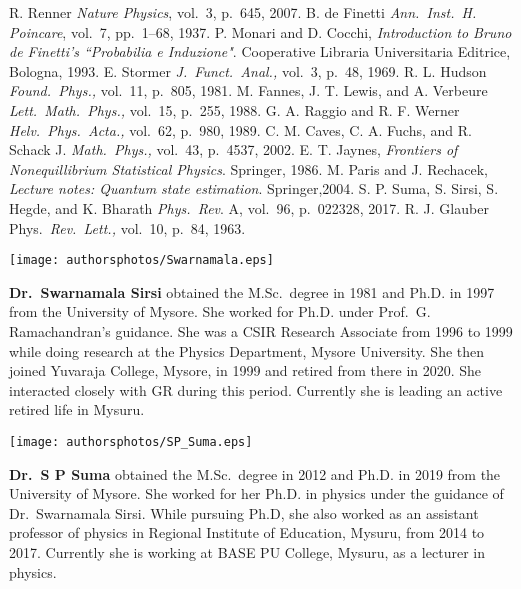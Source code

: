 \begin{thebibliography}{99}
 R. Renner \textit{Nature Physics}, vol.\ 3, p.\ 645, 2007.
 B. de Finetti \textit{Ann.\ Inst.\ H. Poincare}, vol.\ 7, pp.\ 1--68, 1937.
 P. Monari and D. Cocchi, \textit{Introduction to Bruno de Finetti's ``Probabilia e Induzione"}. Cooperative Libraria Universitaria Editrice, Bologna, 1993.
 E. Stormer \textit{J.\ Funct.\ Anal.,} vol.\ 3, p.\ 48, 1969.
 R. L. Hudson \textit{Found.\ Phys.,} vol.\ 11, p.\ 805, 1981.
 M. Fannes, J. T. Lewis, and A. Verbeure \textit{Lett.\ Math.\ Phys.,} vol.\ 15, p.\ 255, 1988.
 G. A. Raggio and R. F. Werner \textit{Helv.\ Phys.\ Acta.,} vol.\ 62, p.\ 980, 1989.
 C. M. Caves, C. A. Fuchs, and R. Schack J. \textit{Math.\ Phys.,} vol.\ 43, p.\ 4537, 2002.
 E. T. Jaynes, \textit{Frontiers of Nonequillibrium Statistical Physics}. Springer, 1986.
 M. Paris and J. Rechacek, \textit{Lecture notes: Quantum state estimation}. Springer,2004.
 S. P. Suma, S. Sirsi, S. Hegde, and K. Bharath \textit{Phys.\ Rev}. A, vol.\ 96, p.\ 022328, 2017.
 R. J. Glauber Phys.\ \textit{Rev.\ Lett.,} vol.\ 10, p.\ 84, 1963.
\end{thebibliography}
\newpage

\centerline{\texttt{[image: authorsphotos/Swarnamala.eps]}}
\bigskip

\noindent
\textbf{Dr.\ Swarnamala Sirsi} obtained the M.Sc.\ degree in 1981 and Ph.D. in 1997 from the University of Mysore. She worked for Ph.D. under Prof.\ G. Ramachandran’s guidance. She was a CSIR Research Associate from 1996 to 1999 while doing research at the Physics Department, Mysore University. She then joined Yuvaraja College, Mysore, in 1999 and retired from there in 2020. She interacted closely with GR during this period. Currently she is leading an active retired life in Mysuru.
\vskip 1cm

\centerline{\texttt{[image: authorsphotos/SP\_Suma.eps]}}
\bigskip

\noindent
\textbf{Dr.\ S P Suma} obtained the M.Sc.\ degree in 2012 and Ph.D. in 2019 from the University of Mysore. She worked for her Ph.D.  in physics under the guidance of Dr.\ Swarnamala Sirsi.  While pursuing Ph.D, she also worked as an assistant professor of physics in Regional Institute of Education, Mysuru, from 2014 to 2017. Currently she is working at BASE PU College, Mysuru, as a lecturer in physics.
